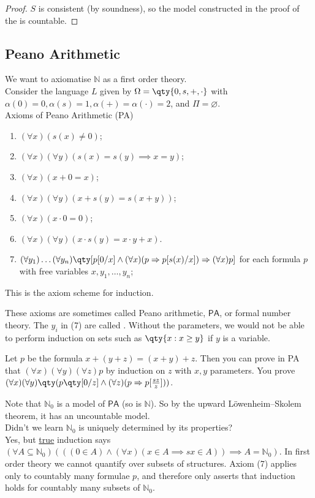 \begin{proof}
    $S$ is consistent (by soundness), so the model constructed in the proof of the  is countable.
\end{proof}

\subsection{Peano Arithmetic}

We want to axiomatise $\mathbb{N}$ as a first order theory. \\
Consider the language $L$ given by $\Omega = \qty{0, s, +, \cdot}$ with $\alpha(0) = 0, \alpha(s) = 1, \alpha(+) = \alpha(\cdot) = 2$, and $\Pi = \varnothing$.\\
Axioms of Peano Arithmetic (PA)
\begin{enumerate}
    \item $(\forall x)(s(x) \neq 0)$;
    \item $(\forall x)(\forall y)(s(x) = s(y) \implies x = y)$;
    \item $(\forall x)(x + 0 = x)$;
    \item $(\forall x)(\forall y)(x + s(y) = s(x + y))$;
    \item $(\forall x)(x \cdot 0 = 0)$;
    \item $(\forall x)(\forall y)(x \cdot s(y) = x \cdot y + x)$.
    \item $(\forall y_1)\dots(\forall y_n)\qty[p[0/x] \wedge (\forall x)(p \implies p[s(x)/x]) \implies (\forall x)p]$ for each formula $p$ with free variables $x, y_1, \dots, y_n$;
\end{enumerate}
This is the axiom scheme for induction.

These axioms are sometimes called Peano arithmetic, $\mathsf{PA}$, or formal number theory.
The $y_i$ in (7) are called .
Without the parameters, we would not be able to perform induction on sets such as $\qty{x : x \geq y}$ if $y$ is a variable.

\begin{remark}
    Let $p$ be the formula $x + (y + z) = (x + y) + z$.
    Then you can prove in PA that $(\forall x) (\forall y) (\forall z) p$ by induction on $z$ with $x, y$ parameters.
    You prove $(\forall x) (\forall y) \qty(p\qty[0/z] \wedge (\forall z) (p \implies p [\frac{sz}{z}]))$.
\end{remark}

Note that $\mathbb{N}_0$ is a model of $\mathsf{PA}$ (so is $\mathbb{N}$).
So by the upward L\"owenheim--Skolem theorem, it has an uncountable model. \\
Didn't we learn $\mathbb{N}_0$ is uniquely determined by its properties? \\
Yes, but \underline{true} induction says $(\forall A \subseteq \mathbb{N}_0)(((0 \in A) \wedge (\forall x)(x \in A \implies sx \in A)) \implies A = \mathbb{N}_0)$.
In first order theory we cannot quantify over subsets of structures.
Axiom (7) applies only to countably many formulae $p$, and therefore only asserts that induction holds for countably many subsets of $\mathbb N_0$.

